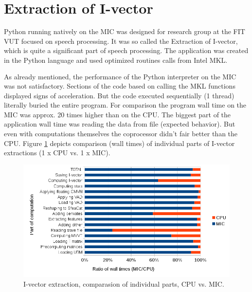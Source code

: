 \section{Extraction of I-vector}
Python running natively on the MIC was designed for research group at the FIT VUT focused on speech processing. It was so called the Extraction of I-vector, which is quite a significant part of speech processing. The application was created in the Python language and used optimized routines calls from Intel MKL.

\par As already mentioned, the performance of the Python interpreter on the MIC was not satisfactory. Sections of the code based on calling the MKL functions displayed signs of acceleration. But the code executed sequentially (1 thread) literally buried the entire program. For comparison the program wall time on the MIC was approx. 20 times higher than on the CPU. The biggest part of the application wall time was reading the data from file (expected behavior). But even with computations themselves the coprocessor didn't fair better than the CPU. Figure \ref{fig:ivector_comparasion} depicts comparison (wall times) of individual parts of I-vector extractions (1 x CPU vs. 1 x MIC).

\begin{figure}[htb]
    \centering
    \includegraphics[width=1\linewidth]{fig/ivector_comparasion.png}
    \caption{I-vector extraction, comparasion of individual parts, CPU vs. MIC.}
    \label{fig:ivector_comparasion}
\end{figure}

